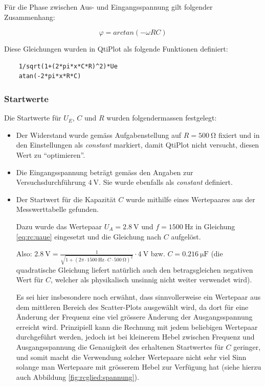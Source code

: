 F\"ur   die  Phase   zwischen   Aus-  und   Eingangsspannung  gilt   folgender
Zusammenhang:

\begin{equation}
    \varphi = arctan(-\omega R C)
    \label{eq:rc:phi}
\end{equation}

Diese Gleichungen wurden in QtiPlot als folgende Funktionen definiert:

\begin{verbatim}
    1/sqrt(1+(2*pi*x*C*R)^2)*Ue
    atan(-2*pi*x*R*C)
\end{verbatim}


\subsubsection{Startwerte}

Die Startwerte f\"ur $U_E$, $C$ und $R$ wurden folgendermassen festgelegt:

\begin{itemize}
    \item
        Der   Widerstand   wurde   gem\"ass    Aufgabenstellung   auf   $R   =
        \SI{500}{\ohm}$ fixiert  und in den Einstellungen  als \emph{constant}
        markiert, damit QtiPlot nicht versucht, diesen Wert zu ``optimieren''.
    \item
        Die    Eingangsspannung   betr\"agt    gem\"ass   den    Angaben   zur
        Versuchsdurchf\"uhrung   $\SI{4}{\volt}$. Sie   wurde  ebenfalls   als
        \emph{constant} definiert.
    \item
        Der   Startwert  f\"ur   die  Kapazit\"at   $C$  wurde   mithilfe eines
        Wertepaares aus der Messwerttabelle gefunden.

        Dazu   wurde   das   Wertepaar   $U_A  =   \SI{2.8}{\volt}$   und   $f
        =   \SI{1500}{\hertz}$   in  Gleichung   \ref{eq:rc:uaue}   eingesetzt
        und   die  Gleichung   nach  $C$   aufgel\"ost.

        Also: $\SI{2.8}{\volt}       =      \frac{1}{\sqrt{1+(2\pi       \cdot
        \SI{1500}{\hertz}    \cdot   C    \cdot   \SI{500}{\ohm})^2}}    \cdot
        \SI{4}{\volt}$ bzw.  $C  = \SI{0.216}{\micro\farad}$ (die quadratische
        Gleichung liefert nat\"urlich auch  den betragsgleichen negativen Wert
        f\"ur $C$,  welcher als  physikalisch unsinnig nicht  weiter verwendet
        wird).

        Es  sei hier  insbesondere  noch erw\"ahnt,  dass sinnvollerweise  ein
        Wertepaar  aus dem  mittleren Bereich  des Scatter-Plots  ausgew\"ahlt
        wird, da dort f\"ur eine  \"Anderung der Frequenz eine viel gr\"ossere
        \"Anderung  der Ausgangsspannung  erreicht wird. Prinzipiell  kann die
        Rechnung mit jedem beliebigen  Wertepaar durchgef\"uhrt werden, jedoch
        ist  bei kleinerem  Hebel zwischen  Frequenz und  Ausgangsspannung die
        Genauigkeit des  erhaltenen Startwertes f\"ur $C$  geringer, und somit
        macht die Verwendung  solcher Wertepaare nicht sehr  viel Sinn solange
        man Wertepaare mit gr\"osserem Hebel zur Verf\"ugung hat (siehe hierzu
        auch Abbildung \ref{fig:rcglied:spannung}).
\end{itemize}

